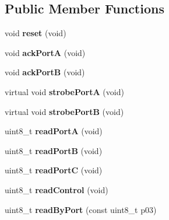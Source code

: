 \subsection*{Public Member Functions}
\begin{DoxyCompactItemize}
\item 
\hypertarget{classIntel8255_ad140a9c3a8dda8fc954a8f25c4d1bfca}{void {\bfseries reset} (void)}\label{classIntel8255_ad140a9c3a8dda8fc954a8f25c4d1bfca}

\item 
\hypertarget{classIntel8255_a1a94705b45a2560e8a81cc2bd5a4275a}{void {\bfseries ack\-Port\-A} (void)}\label{classIntel8255_a1a94705b45a2560e8a81cc2bd5a4275a}

\item 
\hypertarget{classIntel8255_af08c9c489604d0eb1340f41e71a7bdc5}{void {\bfseries ack\-Port\-B} (void)}\label{classIntel8255_af08c9c489604d0eb1340f41e71a7bdc5}

\item 
\hypertarget{classIntel8255_a7794eec4462ed1d6b3888b9af91445c6}{virtual void {\bfseries strobe\-Port\-A} (void)}\label{classIntel8255_a7794eec4462ed1d6b3888b9af91445c6}

\item 
\hypertarget{classIntel8255_aa3fece75effbbf7eeb60a2a44976f1d3}{virtual void {\bfseries strobe\-Port\-B} (void)}\label{classIntel8255_aa3fece75effbbf7eeb60a2a44976f1d3}

\item 
\hypertarget{classIntel8255_a751260da953e9f51d5537664cc6e0173}{uint8\-\_\-t {\bfseries read\-Port\-A} (void)}\label{classIntel8255_a751260da953e9f51d5537664cc6e0173}

\item 
\hypertarget{classIntel8255_a0b4e956de16abf229c6599e8eedbe887}{uint8\-\_\-t {\bfseries read\-Port\-B} (void)}\label{classIntel8255_a0b4e956de16abf229c6599e8eedbe887}

\item 
\hypertarget{classIntel8255_a8d19749a800aa3250004d744d0fa6da8}{uint8\-\_\-t {\bfseries read\-Port\-C} (void)}\label{classIntel8255_a8d19749a800aa3250004d744d0fa6da8}

\item 
\hypertarget{classIntel8255_ab997e7e58d497ed718396817a786892a}{uint8\-\_\-t {\bfseries read\-Control} (void)}\label{classIntel8255_ab997e7e58d497ed718396817a786892a}

\item 
\hypertarget{classIntel8255_a2b1c343c6cfa15e20122571ce3a42c6e}{uint8\-\_\-t {\bfseries read\-By\-Port} (const uint8\-\_\-t p03)}\label{classIntel8255_a2b1c343c6cfa15e20122571ce3a42c6e}


\end{DoxyCompactItemize}

